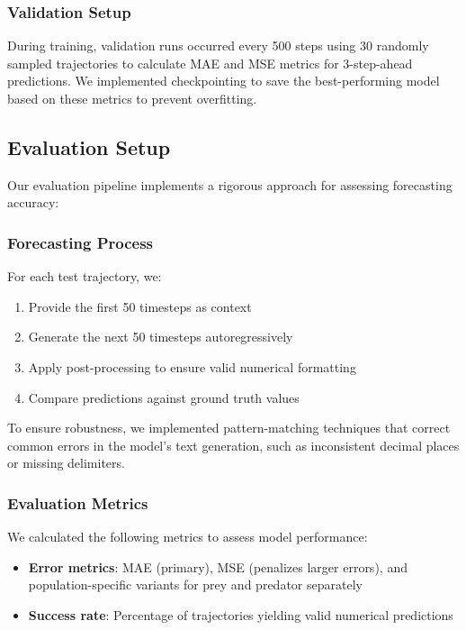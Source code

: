 \documentclass{article}
\begin{document}
\subsubsection*{Validation Setup}
During training, validation runs occurred every 500 steps using 30 randomly sampled trajectories to calculate MAE and MSE metrics for 3-step-ahead predictions. We implemented checkpointing to save the best-performing model based on these metrics to prevent overfitting.

\subsection*{Evaluation Setup}
Our evaluation pipeline implements a rigorous approach for assessing forecasting accuracy:
\subsubsection*{Forecasting Process}

For each test trajectory, we:
\begin{enumerate}
    \item Provide the first 50 timesteps as context
    \item Generate the next 50 timesteps autoregressively
    \item Apply post-processing to ensure valid numerical formatting
    \item Compare predictions against ground truth values
\end{enumerate}

To ensure robustness, we implemented pattern-matching techniques that correct common errors in the model's text generation, such as inconsistent decimal places or missing delimiters.

\subsubsection*{Evaluation Metrics}

We calculated the following metrics to assess model performance:
\begin{itemize}
    \item \textbf{Error metrics}: MAE (primary), MSE (penalizes larger errors), and population-specific variants for prey and predator separately
    \item \textbf{Success rate}: Percentage of trajectories yielding valid numerical predictions
\end{itemize}
\end{document}
